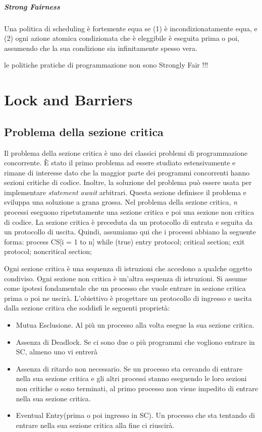 \documentclass[10pt,a4paper]{book}
\begin{document}
\paragraph{Strong Fairness} Una politica di scheduling è fortemente equa se (1) è incondizionatamente equa, e (2) ogni azione atomica condizionata che è eleggibile è eseguita prima o poi, assumendo che la sua condizione sia infinitamente spesso vera.

le politiche pratiche di programmazione non sono Strongly Fair !!!

\chapter{Lock and Barriers}

\section{Problema della sezione critica}
Il problema della sezione critica è uno dei classici problemi di programmazione concorrente. È stato il primo problema ad essere studiato estensivamente e rimane di interesse dato che la maggior parte dei programmi concorrenti hanno sezioni critiche di codice. Inoltre, la soluzione del problema può essere usata per implementare \textit{statement await} arbitrari.
Questa sezione definisce il problema e sviluppa una soluzione a grana grossa.
Nel problema della sezione critica, \textit{n} processi eseguono ripetutamente una sezione critica e poi
una sezione non critica di codice. La sezione critica è preceduta da un protocollo di entrata e seguita da un protocollo di uscita. Quindi, assumiamo qui che i processi abbiano la seguente forma:
process CS[i = 1 to n] {
while (true) {
entry protocol;
critical section;
exit protocol;
noncritical section;
}
}

Ogni sezione critica è una sequenza di istruzioni che accedono a qualche oggetto condiviso.
Ogni sezione non critica è un'altra sequenza di istruzioni.
Si assume come ipotesi fondamentale che un processo che vuole entrare in sezione critica prima o poi ne uscirà.
L'obiettivo è progettare un protocollo di ingresso e uscita dalla sezione critica che soddisfi le seguenti proprietà:
\begin{itemize}
\item Mutua Esclusione. Al più un processo alla volta esegue la sua sezione critica.
\item Assenza di Deadlock. Se ci sono due o più programmi che vogliono entrare in SC, almeno uno vi entrerà
\item Assenza di ritardo non necessario. Se un processo sta cercando di entrare nella sua sezione critica
e gli altri processi stanno eseguendo le loro sezioni non critiche o sono terminati, al primo processo non viene impedito di entrare nella sua sezione critica.
\item Eventual Entry(prima o poi ingresso in SC). Un processo che sta tentando di entrare nella sua sezione critica alla fine ci riuscirà.
\end{itemize}
\end{document}
